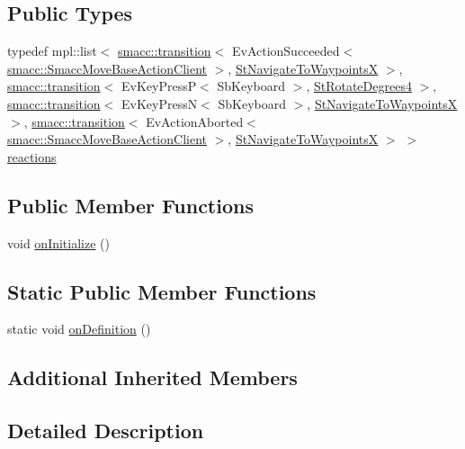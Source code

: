 \subsection*{Public Types}
\begin{DoxyCompactItemize}
\item 
typedef mpl\+::list$<$ \hyperlink{classsmacc_1_1transition}{smacc\+::transition}$<$ Ev\+Action\+Succeeded$<$ \hyperlink{classsmacc_1_1SmaccMoveBaseActionClient}{smacc\+::\+Smacc\+Move\+Base\+Action\+Client} $>$, \hyperlink{structStNavigateToWaypointsX}{St\+Navigate\+To\+WaypointsX} $>$, \hyperlink{classsmacc_1_1transition}{smacc\+::transition}$<$ Ev\+Key\+PressP$<$ Sb\+Keyboard $>$, \hyperlink{structStRotateDegrees4}{St\+Rotate\+Degrees4} $>$, \hyperlink{classsmacc_1_1transition}{smacc\+::transition}$<$ Ev\+Key\+PressN$<$ Sb\+Keyboard $>$, \hyperlink{structStNavigateToWaypointsX}{St\+Navigate\+To\+WaypointsX} $>$, \hyperlink{classsmacc_1_1transition}{smacc\+::transition}$<$ Ev\+Action\+Aborted$<$ \hyperlink{classsmacc_1_1SmaccMoveBaseActionClient}{smacc\+::\+Smacc\+Move\+Base\+Action\+Client} $>$, \hyperlink{structStNavigateToWaypointsX}{St\+Navigate\+To\+WaypointsX} $>$ $>$ \hyperlink{structStNavigateReverse2_a0807908aba7f95f75e120894f172baa2}{reactions}
\end{DoxyCompactItemize}
\subsection*{Public Member Functions}
\begin{DoxyCompactItemize}
\item 
void \hyperlink{structStNavigateReverse2_ac5c81b2766cc7716242d6f71c8b0ea8c}{on\+Initialize} ()
\end{DoxyCompactItemize}
\subsection*{Static Public Member Functions}
\begin{DoxyCompactItemize}
\item 
static void \hyperlink{structStNavigateReverse2_a4d67cfa966a4e4bbb6dedc75007de180}{on\+Definition} ()
\end{DoxyCompactItemize}
\subsection*{Additional Inherited Members}


\subsection{Detailed Description}


